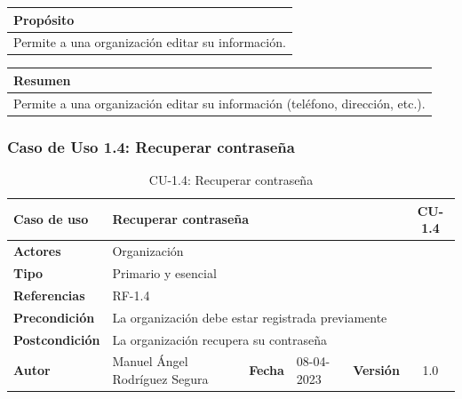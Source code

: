 \begin{table}[H]
    \centering
    \begin{tabularx}{\textwidth}{@{} |L |@{}} \hline
        \textbf{Propósito} \\
        \hline
        Permite a una organización editar su información. \\
        \hline
    \end{tabularx}
\end{table}

\begin{table}[H]
    \centering
    \begin{tabularx}{\textwidth}{@{} |L |@{}} \hline
        \textbf{Resumen} \\
        \hline
        Permite a una organización editar su información (teléfono, dirección, etc.). \\
        \hline
    \end{tabularx}
\end{table}

\subsubsection{Caso de Uso 1.4: Recuperar contraseña}\label{subsubsec:recuperar-contrasena}

\begin{table}[H]
    \begin{center}
        \begin{adjustbox}{width=\textwidth}
            \begin{tabular}{ | l | l | l | l | c | c | }
                \hline
                \textbf{Caso de uso} & \multicolumn{4}{l|}{Recuperar contraseña} & \cellcolor{gray!50} \textbf{CU-1.4}\\
                \hline
                \textbf{Actores} & \multicolumn{5}{p{0.5\linewidth}|}{Organización} \\
                \hline
                \textbf{Tipo} & \multicolumn{5}{l|}{Primario y esencial} \\
                \hline
                \textbf{Referencias} & \multicolumn{3}{l|}{RF-1.4} & \multicolumn{2}{l|}{ }\\
                \hline
                \textbf{Precondición} & \multicolumn{5}{l|}{La organización debe estar registrada previamente} \\
                \hline
                \textbf{Postcondición} & \multicolumn{5}{l|}{La organización recupera su contraseña} \\
                \hline
                \textbf{Autor} & \multicolumn{1}{p{0.25\linewidth}|}{Manuel Ángel Rodríguez Segura} & \textbf{Fecha} &
                08-04-2023     & \textbf{Versión}                                                      & 1.0\\
                \hline
            \end{tabular}
        \end{adjustbox}
        \caption{CU-1.4: Recuperar contraseña}
        \label{tab:recuperar-contrasena}
    \end{center}
\end{table}

